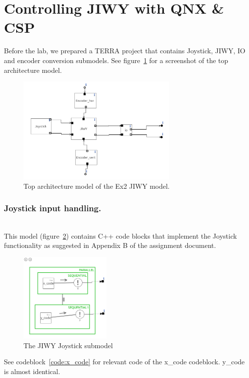 \documentclass[a4paper,twoside,11pt]{article}
\begin{document}
\section{Controlling JIWY with QNX \& CSP}
Before the lab, we prepared a TERRA project that contains Joystick, JIWY, IO and 
encoder conversion submodels. See figure~\ref{fig:jiwy-overview} for a screenshot of the top architecture model.
\begin{figure}[h]
	\centering
	\includegraphics[width=0.7\textwidth]{./img/jiwy-overview.png}
	\caption{Top architecture model of the Ex2 JIWY model.}
	\label{fig:jiwy-overview}
\end{figure}
\subsubsection{Joystick input handling.} \\
This model (figure~\ref{fig:jiwy-joystick}) contains C++ code blocks that implement the Joystick 
functionality as suggested in Appendix B of the assignment document.

\begin{figure}[h]
	\centering
	\includegraphics[width=0.4\textwidth]{./img/jiwy-joystick.png}
	\caption{The JIWY Joystick submodel}
	\label{fig:jiwy-joystick}
\end{figure}
See codeblock~\ref{code:x_code} for relevant code of the x\_code codeblock. y\_code is almost identical.
\end{document}
